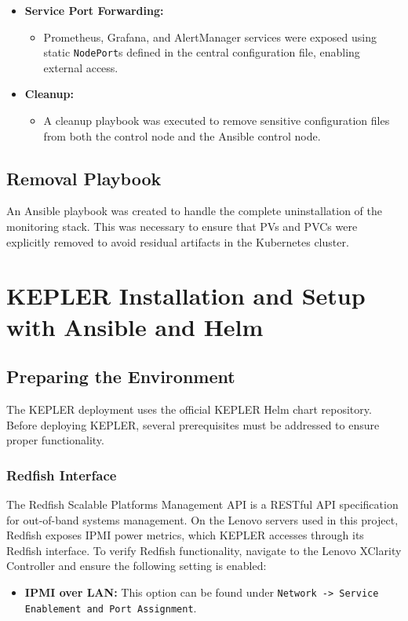 \begin{itemize}
    \item \textbf{Service Port Forwarding:}
    \begin{itemize}
        \item Prometheus, Grafana, and AlertManager services were exposed using static \texttt{NodePort}s defined in the central configuration file, enabling external access.
    \end{itemize}

    \item \textbf{Cleanup:}
    \begin{itemize}
        \item A cleanup playbook was executed to remove sensitive configuration files from both the control node and the Ansible control node.
    \end{itemize}
\end{itemize}

\subsection{Removal Playbook}

An Ansible playbook was created to handle the complete uninstallation of the monitoring stack. This was necessary to ensure that PVs and PVCs were explicitly removed to avoid residual artifacts in the Kubernetes cluster.

\section{KEPLER Installation and Setup with Ansible and Helm}

\subsection{Preparing the Environment}

The KEPLER deployment uses the official KEPLER Helm chart repository. Before deploying KEPLER, several prerequisites must be addressed to ensure proper functionality.

\subsubsection{Redfish Interface}

The Redfish Scalable Platforms Management API is a RESTful API specification for out-of-band systems management. On the Lenovo servers used in this project, Redfish exposes IPMI power metrics, which KEPLER accesses through its Redfish interface. To verify Redfish functionality, navigate to the Lenovo XClarity Controller and ensure the following setting is enabled:
\begin{itemize}
    \item \textbf{IPMI over LAN:} This option can be found under \texttt{Network -> Service Enablement and Port Assignment}.
\end{itemize}


